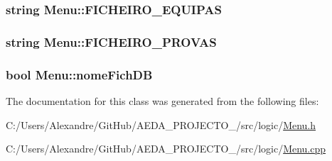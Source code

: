 \subsubsection[{F\+I\+C\+H\+E\+I\+R\+O\+\_\+\+E\+Q\+U\+I\+P\+A\+S}]{\setlength{\rightskip}{0pt plus 5cm}string Menu\+::\+F\+I\+C\+H\+E\+I\+R\+O\+\_\+\+E\+Q\+U\+I\+P\+A\+S\hspace{0.3cm}{\ttfamily [private]}}\label{class_menu_ae54280f85716f145088ac12362643990}
\hypertarget{class_menu_a01ed844b35f6f85bd5e71457309cee88}{}
\subsubsection[{F\+I\+C\+H\+E\+I\+R\+O\+\_\+\+P\+R\+O\+V\+A\+S}]{\setlength{\rightskip}{0pt plus 5cm}string Menu\+::\+F\+I\+C\+H\+E\+I\+R\+O\+\_\+\+P\+R\+O\+V\+A\+S\hspace{0.3cm}{\ttfamily [private]}}\label{class_menu_a01ed844b35f6f85bd5e71457309cee88}
\hypertarget{class_menu_a5af55687e99fc888917344837cdadbd1}{}
\subsubsection[{nome\+Fich\+D\+B}]{\setlength{\rightskip}{0pt plus 5cm}bool Menu\+::nome\+Fich\+D\+B\hspace{0.3cm}{\ttfamily [private]}}\label{class_menu_a5af55687e99fc888917344837cdadbd1}


The documentation for this class was generated from the following files\+:\begin{DoxyCompactItemize}
\item 
C\+:/\+Users/\+Alexandre/\+Git\+Hub/\+A\+E\+D\+A\+\_\+\+P\+R\+O\+J\+E\+C\+T\+O\+\_/src/logic/\hyperlink{_menu_8h}{Menu.\+h}\item 
C\+:/\+Users/\+Alexandre/\+Git\+Hub/\+A\+E\+D\+A\+\_\+\+P\+R\+O\+J\+E\+C\+T\+O\+\_/src/logic/\hyperlink{_menu_8cpp}{Menu.\+cpp}\end{DoxyCompactItemize}
